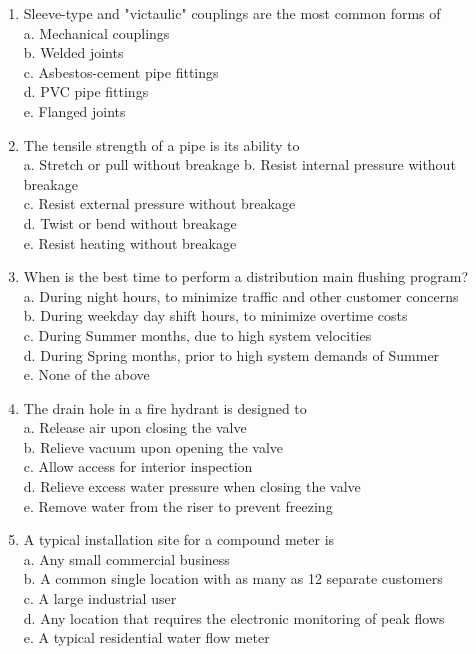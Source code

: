 \documentclass{article}
\begin{document}
\begin{enumerate}[1.]
\item Sleeve-type and "victaulic" couplings are the most common forms of\\
a. Mechanical couplings\\
b. Welded joints\\
c. Asbestos-cement pipe fittings\\
d. PVC pipe fittings\\
e. Flanged joints\\

\item The tensile strength of a pipe is its ability to\\
a. Stretch or pull without breakage
b. Resist internal pressure without breakage\\
c. Resist external pressure without breakage\\
d. Twist or bend without breakage\\
e. Resist heating without breakage\\

\item When is the best time to perform a distribution main flushing program?\\
a. During night hours, to minimize traffic and other customer concerns\\
b. During weekday day shift hours, to minimize overtime costs\\
c. During Summer months, due to high system velocities\\
d. During Spring months, prior to high system demands of Summer\\
e. None of the above\\

\item The drain hole in a fire hydrant is designed to\\
a. Release air upon closing the valve\\
b. Relieve vacuum upon opening the valve\\
c. Allow access for interior inspection\\
d. Relieve excess water pressure when closing the valve\\
e. Remove water from the riser to prevent freezing\\

\item A typical installation site for a compound meter is\\
a. Any small commercial business\\
b. A common single location with as many as 12 separate customers\\
c. A large industrial user\\
d. Any location that requires the electronic monitoring of peak flows\\
e. A typical residential water flow meter\\


\end{enumerate}
\end{document}
